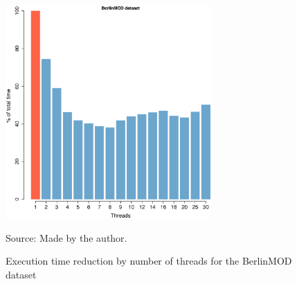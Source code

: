 {\begin{figure}[h!]
    \centering
    \caption{Execution time reduction by number of threads for the BerlinMOD dataset}
    \centerline{\includegraphics[width=0.7\textwidth]{images/BerlinMOD_thread.eps}}
    \footnotesize{Source: Made by the author.}
    \label{fig:berlinmod_threads}
\end{figure}

}
